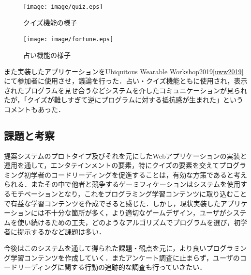 \begin{figure}[H]
  \begin{center}
    \texttt{[image: image/quiz.eps]}
  \end{center}
    \vspace{-8mm} 
  \caption{クイズ機能の様子}
  \label{quiz}
\end{figure}

\begin{figure}[H]
  \begin{center}
    \texttt{[image: image/fortune.eps]}
  \end{center}
    \vspace{-8mm} 
  \caption{占い機能の様子}
  \label{fortune}
\end{figure}

また実装したアプリケーションをUbiquitous Wearable Workshop2019\ref{uww2019}にて参加者に使用させ，議論を行った．占い・クイズ機能ともに使用され，表示されたプログラムを見せ合うなどシステムを介したコミュニケーションが見られたが，「クイズが難しすぎて逆にプログラムに対する抵抗感が生まれた」というコメントもあった．




\subsection{課題と考察}

提案システムのプロトタイプ及びそれを元にしたWebアプリケーションの実装と運用を通して，エンタテインメントの要素，特にクイズの要素を交えてプログラミング初学者のコードリーディングを促進することは，有効な方策であると考えられる．またその中で他者と競争するゲーミフィケーションはシステムを使用するモチベーションとなり，これをプログラミング学習コンテンツに取り込むことで有益な学習コンテンツを作成できると感じた．しかし，現状実装したアプリケーションには不十分な箇所が多く，より適切なゲームデザイン，ユーザがシステムを使い続けるための工夫，どのようなアルゴリズムでプログラムを選び，初学者に提示するかなど課題は多い．

今後はこのシステムを通して得られた課題・観点を元に，より良いプログラミング学習コンテンツを作成していく．またアンケート調査に止まらず，ユーザのコードリーディングに関する行動の追跡的な調査も行っていきたい．
